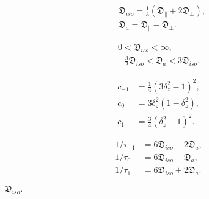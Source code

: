 \documentclass[a4paper,11pt,twoside,openright]{book}
\def\lthtmlcheckvsize{\ifdim\ht\sizebox<\vsize 
  \ifdim\wd\sizebox<\hsize\expandafter\hfill\fi \expandafter\vfill
  \else\expandafter\vss\fi}%
\begin{document}
{\newpage\clearpage
\setcounter{equation}{15}
%
\begin{subequations}\begin{align}
& \mathfrak{D}_{iso} = \tfrac{1}{3} (\mathfrak{D}_{\scriptscriptstyle \parallel}+ 2\mathfrak{D}_{\scriptscriptstyle \perp}),\\
& \mathfrak{D}_a = \mathfrak{D}_{\scriptscriptstyle \parallel}- \mathfrak{D}_{\scriptscriptstyle \perp}.\end{align}\end{subequations}%
\lthtmldisplayZ
\lthtmlcheckvsize\clearpage}

{\newpage\clearpage
\setcounter{equation}{16}
%
\begin{subequations}\begin{gather}
0 < \mathfrak{D}_{iso} < \infty, \\
-\tfrac{3}{2} \mathfrak{D}_{iso} < \mathfrak{D}_a < 3\mathfrak{D}_{iso}.
\end{gather}\end{subequations}%
\lthtmldisplayZ
\lthtmlcheckvsize\clearpage}

{\newpage\clearpage
\setcounter{equation}{17}
%
\begin{subequations}\begin{align}
c_{-1} &= \tfrac{1}{4}(3\delta_z^2 - 1)^2,\\
c_{0}  &= 3\delta_z^2(1 - \delta_z^2),\\
c_{1}  &= \tfrac{3}{4}(\delta_z^2 - 1)^2.\end{align}\end{subequations}%
\lthtmldisplayZ
\lthtmlcheckvsize\clearpage}

{\newpage\clearpage
\setcounter{equation}{18}
%
\begin{subequations}\begin{align}
1/\tau_{-1} &= 6\mathfrak{D}_{iso} - 2\mathfrak{D}_a,\\
1/\tau_{0}  &= 6\mathfrak{D}_{iso} - \mathfrak{D}_a,\\
1/\tau_{1}  &= 6\mathfrak{D}_{iso} + 2\mathfrak{D}_a.\end{align}\end{subequations}%
\lthtmldisplayZ
\lthtmlcheckvsize\clearpage}

{\newpage\clearpage
{}%
$\displaystyle \mathfrak{D}_{iso}.$%
\lthtmlindisplaymathZ
\lthtmlcheckvsize\clearpage}
\end{document}
